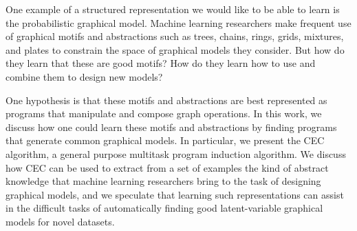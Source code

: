 \documentclass{article} %
\begin{document}
One example of a structured representation we would like to be able to learn is the probabilistic graphical model. %
Machine learning researchers make frequent use of graphical motifs and abstractions such as trees, chains, rings, grids, mixtures, and plates to constrain the space of graphical models they consider. But how do they learn that these are good motifs? How do they learn how to use and combine them to design new models? 

One hypothesis is that these motifs and abstractions are best represented as programs that manipulate and compose graph operations. In this work, we discuss how one could learn these motifs and abstractions by finding programs that generate common graphical models. In particular, we present the CEC algorithm, a general purpose multitask program induction algorithm.
We discuss how CEC can be used to extract from a set of examples the kind of abstract knowledge that machine learning researchers bring to the task of designing graphical models, and we speculate that learning such representations can assist in the difficult tasks of automatically finding good latent-variable graphical models for novel datasets. 

\end{document}
